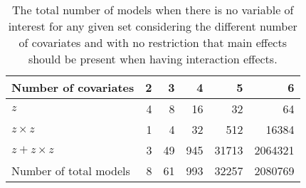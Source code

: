 \begin{table}[!h]
\centering
\caption{The total number of models when there is no variable of interest for any given set considering the different number of covariates and with no restriction that main effects should be present when having interaction effects.} 
\label{tab:appmodel6}
\begin{tabular}{lrrrrr}
  \hline
Number of covariates & 2 & 3 & 4 & 5 & 6 \\ 
  \hline
  $ z$ & 4 & 8 & 16 & 32 & 64 \\ 
  $z \times z$ & 1 & 4 & 32 & 512 & 16384 \\ 
  $ z + z \times z$ & 3 & 49 & 945 & 31713 & 2064321 \\ 
  \hline
  Number of total models & 8 & 61 & 993 & 32257 & 2080769 \\ 
   \hline
\end{tabular}
\end{table}
